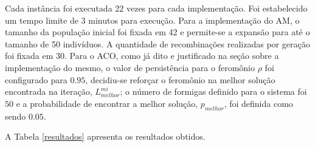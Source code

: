 Cada instância foi executada 22 vezes para cada implementação. Foi
estabelecido um tempo limite de 3 minutos para execução.
Para a implementação do AM, o tamanho da população inicial foi fixada
em 42 e permite-se a expansão para até o tamanho de 50 indivíduos. A
quantidade de recombinações realizadas por geração foi fixada em 30.
Para o ACO, como já dito e justificado na seção sobre a implementação do
mesmo, o valor de persistência para o feromônio $\rho$ foi configurado para
$0.95$, decidiu-se reforçar o feromônio na melhor solução encontrada na
iteração, $L_{melhor}^{mi}$; o número de formigas definido para o sistema
foi $50$ e a probabilidade de encontrar a melhor solução, $p_{melhor}$, foi definida
como sendo $0.05$.

A Tabela \ref{resultados} apresenta os resultados obtidos.

